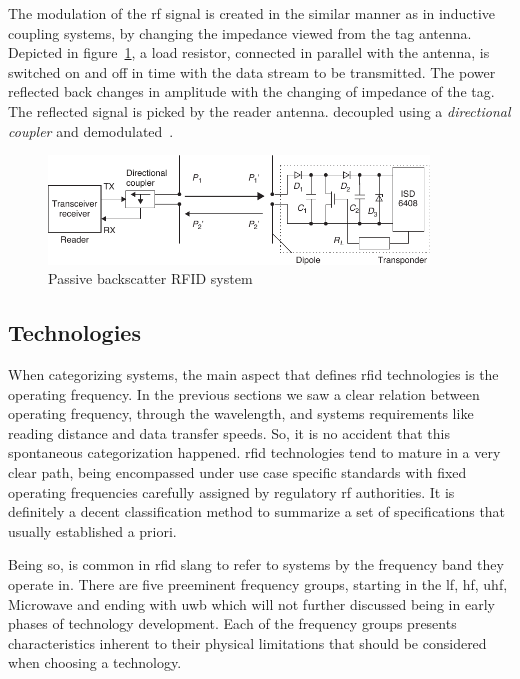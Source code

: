 The modulation of the \ac{rf} signal is created in the similar manner as in inductive coupling systems, by changing the impedance viewed from the tag antenna. 
Depicted in figure~\ref{fig:backscatter}, a load resistor, connected in parallel with the antenna, is switched on and off in time with the data stream to be transmitted.
The power reflected back changes in amplitude with the changing of impedance of the tag.
The reflected signal is picked by the reader antenna. decoupled using a \emph{directional coupler} and demodulated~\cite{finkenzellerRFIDHandbookFundamentals2003, RFIDCouplingTechniques}.

\begin{figure}[!ht]
    \centering
    \includegraphics[width=0.9\textwidth]{./figs/02-state-of-the-art/backscatter.pdf}
    \caption{Passive backscatter RFID system~\cite{finkenzellerRFIDHandbookFundamentals2003}} 
    \label{fig:backscatter}
\end{figure}

\subsection{Technologies} \label{sec:opfrequency}

When categorizing systems, the main aspect that defines \ac{rfid} technologies is the operating frequency.
In the previous sections we saw a clear relation between operating frequency, through the wavelength, and systems requirements like reading distance and data transfer speeds.
So, it is no accident that this spontaneous categorization happened. \ac{rfid} technologies tend to mature in a very clear path, being encompassed under use case specific standards with fixed operating frequencies carefully assigned by regulatory \ac{rf} authorities. 
It is definitely a decent classification method to summarize a set of specifications that usually established a priori.

Being so, is common in \ac{rfid} slang to refer to systems by the frequency band they operate in.
There are five preeminent frequency groups, starting in the \ac{lf}, \ac{hf}, \ac{uhf}, Microwave and ending with \ac{uwb} which will not further discussed being in early phases of technology development.
Each of the frequency groups presents characteristics inherent to their physical limitations that should be considered when choosing a technology.

